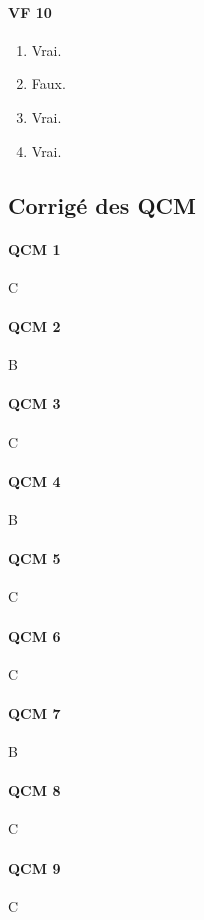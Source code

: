 \documentclass[11pt,a4paper]{article}
\theoremstyle{definition}
\begin{document}
\paragraph{VF 10}
\begin{enumerate}[label=\alph*)]
    \item Vrai.
    \item Faux.
    \item Vrai.
    \item Vrai.
\end{enumerate}

\subsection{Corrigé des QCM}

\paragraph{QCM 1} C

\paragraph{QCM 2} B

\paragraph{QCM 3} C

\paragraph{QCM 4} B

\paragraph{QCM 5} C

\paragraph{QCM 6} C

\paragraph{QCM 7} B

\paragraph{QCM 8} C

\paragraph{QCM 9} C
\end{document}
